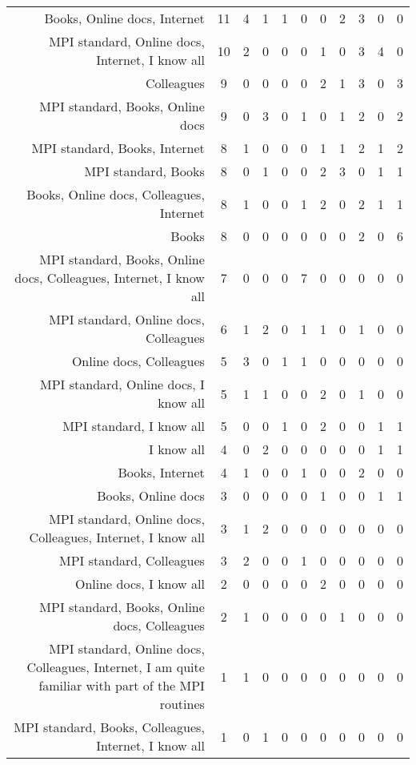 {\begin{landscape}
\begin{longtable}[htb]{r|c|c|c|c|c|c|c|c|c|c}
{Books, Online docs, Internet} & 11 & 4 & 1 & 1 & 0 & 0 & 2 & 3 & 0 & 0 \\%
{MPI standard, Online docs, Internet, I know all} & 10 & 2 & 0 & 0 & 0 & 1 & 0 & 3 & 4 & 0 \\%
{Colleagues} & 9 & 0 & 0 & 0 & 0 & 2 & 1 & 3 & 0 & 3 \\%
{MPI standard, Books, Online docs} & 9 & 0 & 3 & 0 & 1 & 0 & 1 & 2 & 0 & 2 \\%
{MPI standard, Books, Internet} & 8 & 1 & 0 & 0 & 0 & 1 & 1 & 2 & 1 & 2 \\%
{MPI standard, Books} & 8 & 0 & 1 & 0 & 0 & 2 & 3 & 0 & 1 & 1 \\%
{Books, Online docs, Colleagues, Internet} & 8 & 1 & 0 & 0 & 1 & 2 & 0 & 2 & 1 & 1 \\%
{Books} & 8 & 0 & 0 & 0 & 0 & 0 & 0 & 2 & 0 & 6 \\%
{MPI standard, Books, Online docs, Colleagues, Internet, I know all} & 7 & 0 & 0 & 0 & 7 & 0 & 0 & 0 & 0 & 0 \\%
{MPI standard, Online docs, Colleagues} & 6 & 1 & 2 & 0 & 1 & 1 & 0 & 1 & 0 & 0 \\%
{Online docs, Colleagues} & 5 & 3 & 0 & 1 & 1 & 0 & 0 & 0 & 0 & 0 \\%
{MPI standard, Online docs, I know all} & 5 & 1 & 1 & 0 & 0 & 2 & 0 & 1 & 0 & 0 \\%
{MPI standard, I know all} & 5 & 0 & 0 & 1 & 0 & 2 & 0 & 0 & 1 & 1 \\%
{I know all} & 4 & 0 & 2 & 0 & 0 & 0 & 0 & 0 & 1 & 1 \\%
{Books, Internet} & 4 & 1 & 0 & 0 & 1 & 0 & 0 & 2 & 0 & 0 \\%
{Books, Online docs} & 3 & 0 & 0 & 0 & 0 & 1 & 0 & 0 & 1 & 1 \\%
{MPI standard, Online docs, Colleagues, Internet, I know all} & 3 & 1 & 2 & 0 & 0 & 0 & 0 & 0 & 0 & 0 \\%
{MPI standard, Colleagues} & 3 & 2 & 0 & 0 & 1 & 0 & 0 & 0 & 0 & 0 \\%
{Online docs, I know all} & 2 & 0 & 0 & 0 & 0 & 2 & 0 & 0 & 0 & 0 \\%
{MPI standard, Books, Online docs, Colleagues} & 2 & 1 & 0 & 0 & 0 & 0 & 1 & 0 & 0 & 0 \\%
{MPI standard, Online docs, Colleagues, Internet, I am quite familiar with part of the MPI routines} & 1 & 1 & 0 & 0 & 0 & 0 & 0 & 0 & 0 & 0 \\%
{MPI standard, Books, Colleagues, Internet, I know all} & 1 & 0 & 1 & 0 & 0 & 0 & 0 & 0 & 0 & 0 \\%

\end{longtable}
\end{landscape}}

